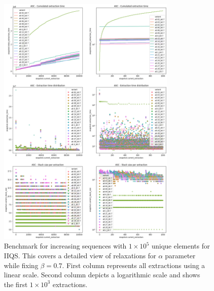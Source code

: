 \begin{figure}[!ht]
    \centering
    \includegraphics[width=0.79\textwidth]{./fragments/04_experimental_execution/images/04_alphabeta_detail_increasing_left.png}
    \caption{Benchmark for increasing sequences with $1\times10^5$ unique elements for IIQS. This covers a detailed view of relaxations for $\alpha$ parameter while fixing $\beta=0.7$. First column represents all extractions using a linear scale. Second column depicts a logarithmic scale and shows the first $1\times10^3$ extractions. }
    \label{FIG:05_ALPHABETA_BENCHMARK_ASC_LEFT}
\end{figure}

